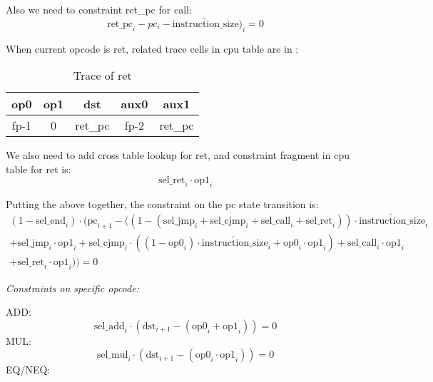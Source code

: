 Also we need to constraint ret\_pc for call:
\[ \mathrm{ret\_pc}_i - pc_i - \widetilde{\mathrm{instruction\_size}})_i = 0 \]

When current opcode is ret, related trace cells in cpu table are in :

\begin{table}[!ht]
    \centering
    \begin{tabular}{|c|c|c|c|c|}
        \hline
        \rowcolor{gray} op0       & op1 & dst                          & aux0                     & aux1                        \\
        \hline
        \cellcolor{green!20} fp-1 & 0   & \cellcolor{green!20} ret\_pc & \cellcolor{blue!20} fp-2 & \cellcolor{blue!20} ret\_pc \\
        \hline
    \end{tabular}
    \caption{Trace of ret}
    \label{table:constraint-ret}
\end{table}

We also need to add cross table lookup for ret, and constraint fragment in cpu table for ret is:
\[ \mathrm{sel\_ret}_i \cdot \mathrm{op1}_i \]

Putting the above together, the constraint on the pc state transition is:
\begin{multline*}
    (1-\mathrm{sel\_end}_i) \cdot (\mathrm{pc}_{i+1}-((1-(\mathrm{sel\_jmp}_i + \mathrm{sel\_cjmp}_i + \mathrm{sel\_call}_i + \mathrm{sel\_ret}_i)) \cdot \widetilde{\mathrm{instruction\_size}}_i \\
    + \mathrm{sel\_jmp}_i \cdot \mathrm{op1}_i + \mathrm{sel\_cjmp}_i \cdot ((1-\mathrm{op0}_i) \cdot \widetilde{\mathrm{instruction\_size}}_i + \mathrm{op0}_i \cdot \mathrm{op1}_i) + \mathrm{sel\_call}_i \cdot \mathrm{op1}_i \\
    + \mathrm{sel\_ret}_i \cdot \mathrm{op1}_i)) = 0
\end{multline*}

\emph{Constraints on specific opcode:}

ADD:
\[ \mathrm{sel\_add}_i \cdot (\mathrm{dst}_{i+1} - (\mathrm{op0}_i + \mathrm{op1}_i))=0 \]
MUL:
\[ \mathrm{sel\_mul}_i \cdot (\mathrm{dst}_{i+1} - (\mathrm{op0}_i \cdot \mathrm{op1}_i))=0 \]
EQ/NEQ:

